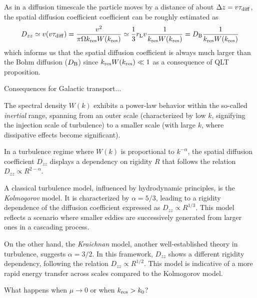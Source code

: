 As in a diffusion timescale the particle moves by a distance of about $\Delta z = v \tau_{\rm diff}$, the spatial diffusion coefficient coefficient can be roughly estimated as
%
\begin{equation}
D_{zz} \simeq v (v \tau_{\rm diff}) = \frac{v^2}{\pi \Omega k_{\rm res} W(k_{\rm res})} \simeq \frac{1}{3} r_{\rm L} v \frac{1}{k_{\rm res} W(k_{\rm res})} = D_{\rm B} \frac{1}{k_{\rm res} W(k_{\rm res})}
\end{equation}
%
which informs us that the spatial diffusion coefficient is always much larger than the Bohm diffusion (\( D_{\rm B} \)) since \( k_{\rm res} W(k_{\rm res}) \ll 1 \) as a consequence of QLT proposition.

{\color{red}Consequences for Galactic transport...}

The spectral density \( W(k) \) exhibits a power-law behavior within the so-called \emph{inertial} range, spanning from an outer scale (characterized by low \( k \), signifying the injection scale of turbulence) to a smaller scale (with large \( k \), where dissipative effects become significant).

In a turbulence regime where \( W(k) \) is proportional to \( k^{-\alpha} \), the spatial diffusion coefficient \( D_{zz} \) displays a dependency on rigidity \( R \) that follows the relation \( D_{zz} \propto R^{2-\alpha} \).

A classical turbulence model, influenced by hydrodynamic principles, is the \emph{Kolmogorov} model. It is characterized by \( \alpha = 5/3 \), leading to a rigidity dependence of the diffusion coefficient expressed as \( D_{zz} \propto R^{1/3} \). This model reflects a scenario where smaller eddies are successively generated from larger ones in a cascading process.

On the other hand, the \emph{Kraichnan} model, another well-established theory in turbulence, suggests \( \alpha = 3/2 \). In this framework, \( D_{zz} \) shows a different rigidity dependency, following the relation \( D_{zz} \propto R^{1/2} \). This model is indicative of a more rapid energy transfer across scales compared to the Kolmogorov model.

{\color{red}What happens when \( \mu \rightarrow 0 \) or when \( k_{\rm res} > k_0 \)?}
